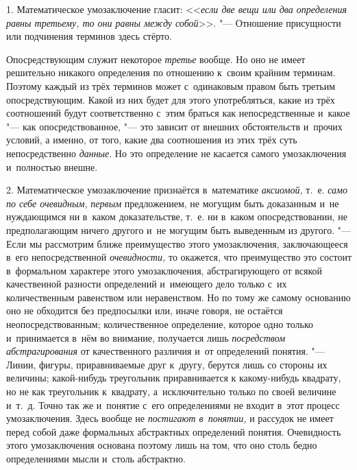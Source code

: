 \label{bkm:bm110a}

1. Математическое умозаключение гласит:
<<{\em если две вещи или два определения
равны третьему, то они равны между собой}>>. "--- Отношение
присущности или подчинения терминов здесь стёрто.

Опосредствующим служит некоторое
{\em третье} вообще. Но
оно не имеет решительно никакого определения по отношению к~своим крайним
терминам. Поэтому каждый из трёх терминов может с~одинаковым правом быть
третьим опосредствующим. Какой из них будет для этого употребляться, какие
из трёх соотношений будут соответственно с~этим браться как
непосредственные и~какое "--- как опосредствованное, "---
это зависит от внешних обстоятельств и~прочих условий, а
именно, от того, какие два соотношения из этих трёх суть непосредственно
{\em данные}. Но это
определение не касается самого умозаключения и~полностью внешне.

2. Математическое умозаключение признаётся в~математике
{\em аксиомой,} т.~е.
{\em само по себе очевидным,}
{\em первым} предложением,
не могущим быть доказанным и~не нуждающимся ни в~каком доказательстве,
т.~е. ни в~каком опосредствовании, не предполагающим ничего другого и~не
могущим быть выведенным из другого. "--- Если мы рассмотрим
ближе преимущество этого умозаключения, заключающееся в~его
непосредственной {\em очевидности,}
то окажется, что преимущество это состоит в~формальном
характере этого умозаключения, абстрагирующего от всякой качественной
разности определений и~имеющего дело только с~их количественным равенством
или неравенством. Но по тому же самому основанию оно не обходится без
предпосылки или, иначе говоря, не остаётся неопосредствованным;
количественное определение, которое одно только и~принимается в~нём во
внимание, получается лишь
{\em посредством абстрагирования}
от качественного различия и~от определений понятия. "---
Линии, фигуры, приравниваемые друг к~другу, берутся лишь со
стороны их величины; какой-нибудь треугольник приравнивается к
какому-нибудь квадрату, но не как треугольник к~квадрату, а~исключительно
только по своей величине и~т.~д. Точно так же и~понятие с~его определениями
не входит в~этот процесс умозаключения. Здесь вообще не
{\em постигают в~понятии,}
и рассудок не имеет перед собой даже формальных абстрактных
определений понятия. Очевидность этого умозаключения основана поэтому лишь
на том, что оно столь бедно определениями мысли и~столь абстрактно.

